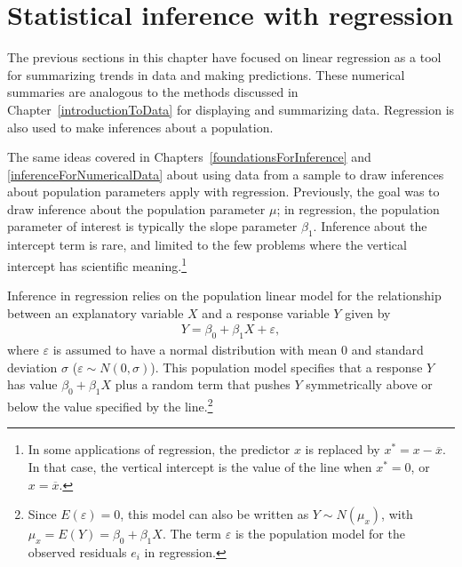 \newpage

\section{Statistical inference with regression}
\label{inferenceRegression}

The previous sections in this chapter have focused on linear regression as a tool for summarizing trends in data and making predictions. These numerical summaries are analogous to the methods discussed in Chapter~\ref{introductionToData} for displaying and summarizing data. Regression is also used to make inferences about a population. 

The same ideas covered in Chapters~\ref{foundationsForInference} and \ref{inferenceForNumericalData} about using data from a sample to draw inferences about population parameters apply with regression. Previously, the goal was to draw inference about the population parameter $\mu$; in regression, the population parameter of interest is typically the slope parameter $\beta_1$. Inference about the intercept term is rare, and limited to the few problems where the vertical intercept has scientific meaning.\footnote{In some applications of regression, the predictor $x$ is replaced by $x^* = x - \overline{x}$.  In that case, the vertical intercept is the value of the line when $x^* = 0$, or $x = \overline{x}$.}

Inference in regression relies on the population linear model for the relationship between an explanatory variable $X$ and a response variable $Y$ given by
\begin{align}
Y = \beta_0 + \beta_1 X + \varepsilon,
\label{regressionPopulationModel}
\end{align}
where $\varepsilon$ is assumed to have a normal distribution with mean 0 and standard deviation $\sigma$ ($\varepsilon \sim N(0, \sigma)$).  This population model specifies that a response $Y$ has value $\beta_0 + \beta_1 X$ plus a random term that pushes $Y$ symmetrically above or below the value specified by the line.\footnote{Since $E(\varepsilon) = 0$, this model can also be written as $Y\sim N(\mu_x)$, with $ \mu_x = E(Y) = \beta_0 + \beta_1 X$.  The term $\varepsilon$ is the population model for the observed residuals $e_i$ in regression.} 

